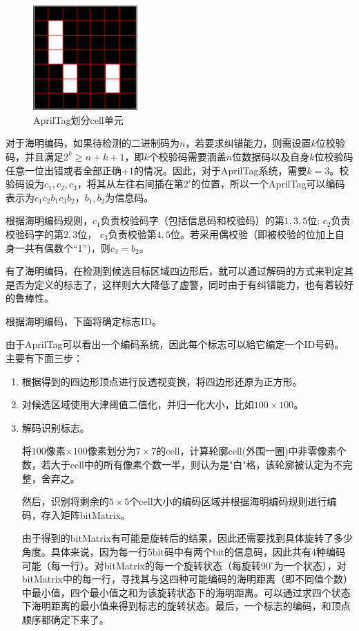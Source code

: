 \begin{figure}[h]
    \centering
    \includegraphics[height=4cm]{figures/AprilTagCell.png}
    \caption{AprilTag划分cell单元}\label{AprilTagCell}
\end{figure}

对于海明编码，如果待检测的二进制码为$n$，若要求纠错能力，则需设置$k$位校验码，并且满足$2^k≥n+k+1$，即$k$个校验码需要涵盖$n$位数据码以及自身$k$位校验码任意一位出错或者全部正确$+1$的情况。因此，对于AprilTag系统，需要$k=3$。校验码设为$c_1,c_2,c_3$，将其从左往右间插在第$2^i$的位置，所以一个AprilTag可以编码表示为$c_1c_2b_1c_3b_2$，$b_1,b_2$为信息码。

根据海明编码规则，$c_1$负责校验码字（包括信息码和校验码）的第$1,3,5$位; $c_2$负责校验码字的第$2,3$位， $c_3$负责校验第$4,5$位。若采用偶校验（即被校验的位加上自身一共有偶数个“1”)，则$c_3=b_2$。
	
有了海明编码，在检测到候选目标区域四边形后，就可以通过解码的方式来判定其是否为定义的标志了，这样则大大降低了虚警，同时由于有纠错能力，也有着较好的鲁棒性。

根据海明编码，下面将确定标志ID。

由于AprilTag可以看出一个编码系统，因此每个标志可以給它编定一个ID号码。主要有下面三步：
\begin{enumerate}[1)]
\item 根据得到的四边形顶点进行反透视变换，将四边形还原为正方形。
\item 对候选区域使用大津阈值二值化，并归一化大小，比如$100\times100$。
\item 解码识别标志。

将$100$像素$\times$$100$像素划分为$7\times7$的cell，计算轮廓cell(外围一圈)中非零像素个数，若大于cell中的所有像素个数一半，则认为是"白"格，该轮廓被认定为不完整，舍弃之。

然后，识别将剩余的$5\times5$个cell大小的编码区域并根据海明编码规则进行编码，存入矩阵bitMatrix。

由于得到的bitMatrix有可能是旋转后的结果，因此还需要找到具体旋转了多少角度。具体来说，因为每一行5bit码中有两个bit的信息码，因此共有4种编码可能（每一行）。对bitMatrix的每一个旋转状态（每旋转$90^\circ$为一个状态），对bitMatrix中的每一行，寻找其与这四种可能编码的海明距离（即不同值个数）中最小值，四个最小值之和为该旋转状态下的海明距离。可以通过求四个状态下海明距离的最小值来得到标志的旋转状态。最后，一个标志的编码，和顶点顺序都确定下来了。
\end{enumerate}




